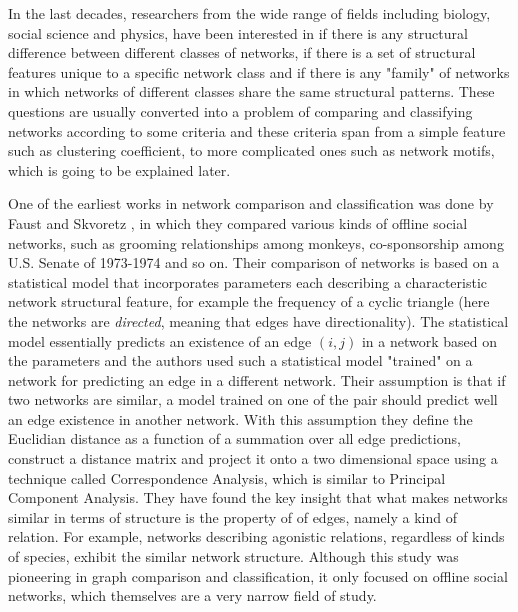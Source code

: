 	
	 In the last decades, researchers from the wide range of fields including biology, social science and physics, have been interested in if there is any structural difference between different classes of networks, if there is a set of structural features unique to a specific network class and if there is any "family" of networks in which networks of different classes share the same structural patterns. These questions are usually converted into a problem of comparing and classifying networks according to some criteria and these criteria span from a simple feature such as clustering coefficient, to more complicated ones such as network motifs, which is going to be explained later.
	
	One of the earliest works in network comparison and classification was done by Faust and Skvoretz \cite{Faust.Skvoretz2002Comparing}, in which they compared various kinds of offline social networks, such as grooming relationships among monkeys, co-sponsorship among U.S. Senate of 1973-1974 and so on. Their comparison of networks is based on a statistical model that incorporates parameters each describing a characteristic network structural feature, for example the frequency of a cyclic triangle (here the networks are \textit{directed}, meaning that edges have directionality). The statistical model essentially predicts an existence of an edge $(i,j)$ in a network based on the parameters and the authors used such a statistical model "trained" on a network for predicting an edge in a different network. Their assumption is that if two networks are similar, a model trained on one of the pair should predict well an edge existence in another network. With this assumption they define the Euclidian distance as a function of a summation over all edge predictions, construct a distance matrix and project it onto a two dimensional space using a technique called Correspondence Analysis, which is similar to Principal Component Analysis. They have found the key insight that what makes networks similar in terms of structure is the property of of edges, namely a kind of relation. For example, networks describing agonistic relations, regardless of kinds of species, exhibit the similar network structure. Although this study was pioneering in graph comparison and classification, it only focused on offline social networks, which themselves are a very narrow field of study.
	
